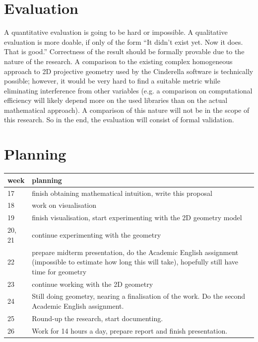 \documentclass[a4paper, 10pt]{article}
\begin{document}
\section{Evaluation}
A quantitative evaluation is going to be hard or impossible. A qualitative
evaluation is more doable, if only of the form ``It didn't exist yet. Now it
does. That is good.'' Correctness of the result should be formally
provable due to the nature of the research. A comparison to the
existing complex homogeneous approach to 2D projective geometry used
by the Cinderella software is technically possible; however, it would be very
hard to find a suitable metric while eliminating interference from other
variables (e.g. a comparison on computational efficiency will likely depend more
on the used libraries than on the actual mathematical approach). A comparison of
this nature will not be in the scope of this research.
So in the end, the evaluation will consist of formal validation.

\section{Planning}
\begin{table}[h!]
  \centering
  \begin{tabular}{| l | p{9cm} |}
    \hline
    week & planning \\
    \hline
    \hline
    17     & finish obtaining mathematical intuition, write this proposal \\
    \hline
    18     & work on visualisation \\
    \hline
    19     & finish visualisation, start experimenting with the 2D geometry model \\
    \hline
    20, 21 & continue experimenting with the geometry \\
    \hline
    22     & prepare midterm presentation, do the Academic English assignment
    (impossible to estimate how long this will take), hopefully still have time for geometry  \\
    \hline
    23     & continue working with the 2D geometry \\
    \hline
    24     & Still doing geometry, nearing a finalisation of the work. Do the
    second Academic English assignment. \\
    \hline
    25     & Round-up the research, start documenting. \\
    \hline
    26     & Work for 14 hours a day, prepare report and
    finish presentation. \\
    \hline
  \end{tabular}
\end{table}
\FloatBarrier



\end{document}
